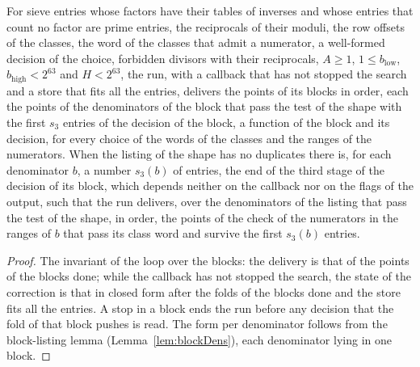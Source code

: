 \begin{theorem}\label{thm:blocks}
  \leanok
  For sieve entries whose factors have their tables of inverses and whose entries that count no
  factor are prime entries, the reciprocals of their moduli, the row offsets of the classes, the
  word of the classes that admit a numerator, a well-formed decision of the choice, forbidden
  divisors with their reciprocals, $A \ge 1$, $1 \le b_{\mathrm{low}}$, $b_{\mathrm{high}} < 2^{63}$
  and $H < 2^{63}$, the run, with a callback that has not stopped the search and a store that fits
  all the entries, delivers the points of its blocks in order, each the points of the denominators
  of the block that pass the test of the shape with the first $s_3$ entries of the decision of the
  block, a function of the block and its decision, for every choice of the words of the classes and
  the ranges of the numerators. When the listing of the shape has no duplicates there is, for each
  denominator $b$, a number $s_3(b)$ of entries, the end of the third stage of the decision of its
  block, which depends neither on the callback nor on the flags of the output, such that the run
  delivers, over the denominators of the listing that pass the test of the shape, in order, the
  points of the check of the numerators in the ranges of $b$ that pass its class word and survive
  the first $s_3(b)$ entries.
\end{theorem}

\begin{proof}
  \leanok
  The invariant of the loop over the blocks: the delivery is that of the points of the blocks done;
  while the callback has not stopped the search, the state of the correction is that in closed form
  after the folds of the blocks done and the store fits all the entries. A stop in a block ends the
  run before any decision that the fold of that block pushes is read. The form per denominator
  follows from the block-listing lemma (Lemma~\ref{lem:blockDens}), each denominator lying in one
  block.
\end{proof}

